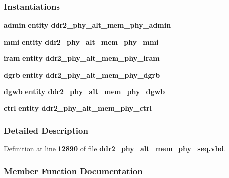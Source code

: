 \subsubsection*{Instantiations}
 \begin{DoxyCompactItemize}
\item 
{\bf admin}  {\bfseries entity ddr2\+\_\+phy\+\_\+alt\+\_\+mem\+\_\+phy\+\_\+admin}   
\item 
{\bf mmi}  {\bfseries entity ddr2\+\_\+phy\+\_\+alt\+\_\+mem\+\_\+phy\+\_\+mmi}   
\item 
{\bf iram}  {\bfseries entity ddr2\+\_\+phy\+\_\+alt\+\_\+mem\+\_\+phy\+\_\+iram}   
\item 
{\bf dgrb}  {\bfseries entity ddr2\+\_\+phy\+\_\+alt\+\_\+mem\+\_\+phy\+\_\+dgrb}   
\item 
{\bf dgwb}  {\bfseries entity ddr2\+\_\+phy\+\_\+alt\+\_\+mem\+\_\+phy\+\_\+dgwb}   
\item 
{\bf ctrl}  {\bfseries entity ddr2\+\_\+phy\+\_\+alt\+\_\+mem\+\_\+phy\+\_\+ctrl}   
\end{DoxyCompactItemize}


\subsubsection{Detailed Description}


Definition at line {\bf 12890} of file {\bf ddr2\+\_\+phy\+\_\+alt\+\_\+mem\+\_\+phy\+\_\+seq.\+vhd}.



\subsubsection{Member Function Documentation}
